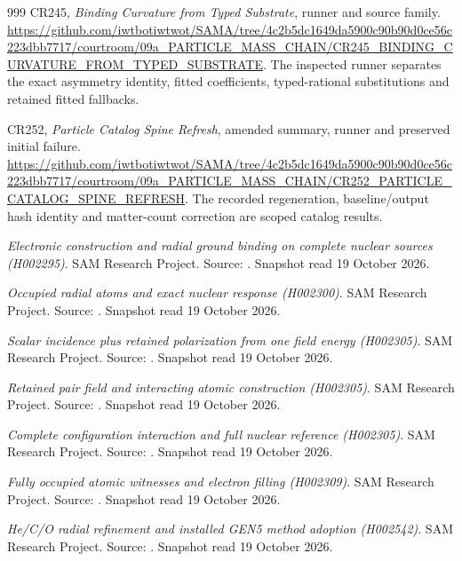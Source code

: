 \begin{thebibliography}{999}
CR245, \emph{Binding Curvature from Typed Substrate}, runner and source family.
\url{https://github.com/iwtbotiwtwot/SAMA/tree/4c2b5dc1649da5900c90b90d0ce56c223dbb7717/courtroom/09a_PARTICLE_MASS_CHAIN/CR245_BINDING_CURVATURE_FROM_TYPED_SUBSTRATE}.
The inspected runner separates the exact asymmetry identity, fitted coefficients, typed-rational substitutions and retained fitted fallbacks.

CR252, \emph{Particle Catalog Spine Refresh}, amended summary, runner and preserved initial failure.
\url{https://github.com/iwtbotiwtwot/SAMA/tree/4c2b5dc1649da5900c90b90d0ce56c223dbb7717/courtroom/09a_PARTICLE_MASS_CHAIN/CR252_PARTICLE_CATALOG_SPINE_REFRESH}.
The recorded regeneration, baseline/output hash identity and matter-count correction are scoped catalog results.


 \emph{Electronic construction and radial ground binding on complete nuclear sources (H002295)}. SAM Research Project. Source: . Snapshot read 19 October 2026.

 \emph{Occupied radial atoms and exact nuclear response (H002300)}. SAM Research Project. Source: . Snapshot read 19 October 2026.

 \emph{Scalar incidence plus retained polarization from one field energy (H002305)}. SAM Research Project. Source: . Snapshot read 19 October 2026.

 \emph{Retained pair field and interacting atomic construction (H002305)}. SAM Research Project. Source: . Snapshot read 19 October 2026.

 \emph{Complete configuration interaction and full nuclear reference (H002305)}. SAM Research Project. Source: . Snapshot read 19 October 2026.

 \emph{Fully occupied atomic witnesses and electron filling (H002309)}. SAM Research Project. Source: . Snapshot read 19 October 2026.

 \emph{He/C/O radial refinement and installed GEN5 method adoption (H002542)}. SAM Research Project. Source: . Snapshot read 19 October 2026.


\end{thebibliography}

